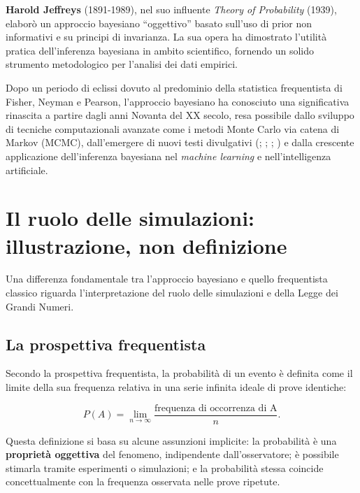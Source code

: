 \documentclass[
  letterpaper,
  DIV=11,
  numbers=noendperiod,
  oneside]{scrreprt}
\theoremstyle{definition}
\theoremstyle{plain}
\theoremstyle{definition}
\theoremstyle{remark}
\begin{document}
\textbf{Harold Jeffreys} (1891-1989), nel suo influente \emph{Theory of
Probability} (1939), elaborò un approccio bayesiano ``oggettivo'' basato
sull'uso di prior non informativi e su principi di invarianza. La sua
opera ha dimostrato l'utilità pratica dell'inferenza bayesiana in ambito
scientifico, fornendo un solido strumento metodologico per l'analisi dei
dati empirici.

Dopo un periodo di eclissi dovuto al predominio della statistica
frequentista di Fisher, Neyman e Pearson, l'approccio bayesiano ha
conosciuto una significativa rinascita a partire dagli anni Novanta del
XX secolo, resa possibile dallo sviluppo di tecniche computazionali
avanzate come i metodi Monte Carlo via catena di Markov (MCMC),
dall'emergere di nuovi testi divulgativi
(;
;
;
) e dalla crescente
applicazione dell'inferenza bayesiana nel \emph{machine learning} e
nell'intelligenza artificiale.

\section{Il ruolo delle simulazioni: illustrazione, non
definizione}\label{il-ruolo-delle-simulazioni-illustrazione-non-definizione}

Una differenza fondamentale tra l'approccio bayesiano e quello
frequentista classico riguarda l'interpretazione del ruolo delle
simulazioni e della Legge dei Grandi Numeri.

\subsection{La prospettiva
frequentista}\label{la-prospettiva-frequentista}

Secondo la prospettiva frequentista, la probabilità di un evento è
definita come il limite della sua frequenza relativa in una serie
infinita ideale di prove identiche:

\[
P(A) = \lim_{n \to \infty} \frac{\text{frequenza di occorrenza di A}}{n}.
\]

Questa definizione si basa su alcune assunzioni implicite: la
probabilità è una \textbf{proprietà oggettiva} del fenomeno,
indipendente dall'osservatore; è possibile stimarla tramite esperimenti
o simulazioni; e la probabilità stessa coincide concettualmente con la
frequenza osservata nelle prove ripetute.
\end{document}
